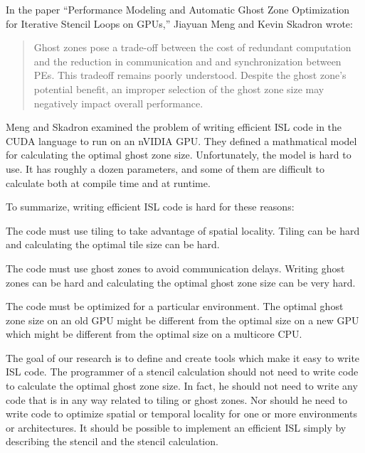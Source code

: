 \documentclass{styles/sig-alternate}
\begin{document}
In the paper ``Performance Modeling and Automatic Ghost Zone
Optimization for Iterative Stencil Loops on GPUs,'' \cite{meng}
Jiayuan Meng and Kevin Skadron wrote:

\begin{quote}
Ghost zones pose a trade-off between the cost of redundant computation
and the reduction in communication and and synchronization between
PEs.  This tradeoff remains poorly understood.  Despite the ghost
zone's potential benefit, an improper selection of the ghost zone size
may negatively impact overall performance.
\end{quote}

Meng and Skadron examined the problem of writing efficient ISL code in
the CUDA language to run on an nVIDIA GPU.  They defined a mathmatical
model for calculating the optimal ghost zone size.  Unfortunately, the
model is hard to use.  It has roughly a dozen parameters, and some of
them are difficult to calculate both at compile time and at runtime.

To summarize, writing efficient ISL code is hard for these reasons:
\begin{itemize*}
\item The code must use tiling to take advantage of spatial locality.
  Tiling can be hard and calculating the optimal tile size can be
  hard.
\item The code must use ghost zones to avoid communication delays.
  Writing ghost zones can be hard and calculating the optimal ghost
  zone size can be very hard.
\item The code must be optimized for a particular environment.  The
  optimal ghost zone size on an old GPU might be different from the
  optimal size on a new GPU which might be different from the optimal
  size on a multicore CPU.
\end{itemize*}

The goal of our research is to define and create tools which make it
easy to write ISL code.  The programmer of a stencil calculation
should not need to write code to calculate the optimal ghost zone
size.  In fact, he should not need to write any code that is in any
way related to tiling or ghost zones.  Nor should he need to write
code to optimize spatial or temporal locality for one or more
environments or architectures.  It should be possible to implement an
efficient ISL simply by describing the stencil and the stencil
calculation.
\end{document}
